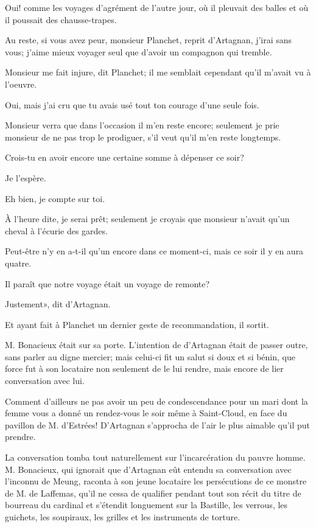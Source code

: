\speak  Oui! comme les voyages d'agrément de l'autre jour, où il pleuvait des balles et où il poussait des chausse-trapes. 

\speak  Au reste, si vous avez peur, monsieur Planchet, reprit d'Artagnan, j'irai sans vous; j'aime mieux voyager seul que d'avoir un compagnon qui tremble. 

\speak  Monsieur me fait injure, dit Planchet; il me semblait cependant qu'il m'avait vu à l'oeuvre. 

\speak  Oui, mais j'ai cru que tu avais usé tout ton courage d'une seule fois. 

\speak  Monsieur verra que dans l'occasion il m'en reste encore; seulement je prie monsieur de ne pas trop le prodiguer, s'il veut qu'il m'en reste longtemps. 

\speak  Crois-tu en avoir encore une certaine somme à dépenser ce soir? 

\speak  Je l'espère. 

\speak  Eh bien, je compte sur toi. 

\speak  À l'heure dite, je serai prêt; seulement je croyais que monsieur n'avait qu'un cheval à l'écurie des gardes. 

\speak  Peut-être n'y en a-t-il qu'un encore dans ce moment-ci, mais ce soir il y en aura quatre. 

\speak  Il paraît que notre voyage était un voyage de remonte? 

\speak  Justement», dit d'Artagnan. 

Et ayant fait à Planchet un dernier geste de recommandation, il sortit. 

M. Bonacieux était sur sa porte. L'intention de d'Artagnan était de passer outre, sans parler au digne mercier; mais celui-ci fit un salut si doux et si bénin, que force fut à son locataire non seulement de le lui rendre, mais encore de lier conversation avec lui. 

Comment d'ailleurs ne pas avoir un peu de condescendance pour un mari dont la femme vous a donné un rendez-vous le soir même à Saint-Cloud, en face du pavillon de M. d'Estrées! D'Artagnan s'approcha de l'air le plus aimable qu'il put prendre. 

La conversation tomba tout naturellement sur l'incarcération du pauvre homme. M. Bonacieux, qui ignorait que d'Artagnan eût entendu sa conversation avec l'inconnu de Meung, raconta à son jeune locataire les persécutions de ce monstre de M. de Laffemas, qu'il ne cessa de qualifier pendant tout son récit du titre de bourreau du cardinal et s'étendit longuement sur la Bastille, les verrous, les guichets, les soupiraux, les grilles et les instruments de torture. 

